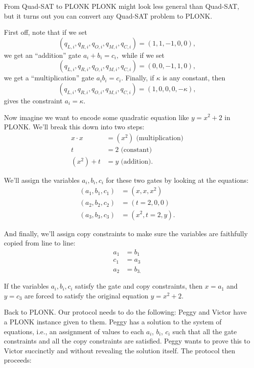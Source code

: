 \begin{remark}{From Quad-SAT to PLONK}{}
PLONK might look less general than Quad-SAT,
but it turns out you can convert any Quad-SAT problem to PLONK.

First off, note that if we set
\[( q_{L,i},q_{R,i},q_{O,i},q_{M,i},q_{C,i} ) = (1,1, - 1,0,0),\]
we get an ``addition'' gate $a_{i} + b_{i} = c_{i},$ while if we set
\[( q_{L,i},q_{R,i},q_{O,i},q_{M,i},q_{C,i} ) = (0,0, - 1,1,0),\]
we get a ``multiplication'' gate $a_{i}b_{i} = c_{i}.$ Finally, if
$\kappa$ is any constant, then
\[( q_{L,i},q_{R,i},q_{O,i},q_{M,i},q_{C,i} ) = (1,0,0,0, - \kappa),\]
gives the constraint $a_{i} = \kappa.$

Now imagine we want to encode some quadratic equation like
$y = x^{2} + 2$ in PLONK. We'll break this down into two steps:
\[\begin{aligned}
x \cdot x & = ( x^{2} )\text{ (multiplication)} \\
t & = 2\text{ (constant)} \\
( x^{2} ) + t & = y\text{ (addition)}.
\end{aligned}\]

We'll assign the variables $a_{i},b_{i},c_{i}$ for these two gates
by looking at the equations: \[\begin{aligned}
( a_{1},b_{1},c_{1} ) & = ( x,x,x^{2} ) \\
( a_{2},b_{2},c_{2} ) & = (t = 2,0,0) \\
( a_{3},b_{3},c_{3} ) & = ( x^{2},t = 2,y ).
\end{aligned}\]

And finally, we'll assign copy constraints to make sure the variables
are faithfully copied from line to line: \[\begin{aligned}
a_{1} & = b_{1} \\
c_{1} & = a_{3} \\
a_{2} & = b_{3.}
\end{aligned}\]

If the variables $a_{i},b_{i},c_{i}$ satisfy the gate and copy
constraints, then $x = a_{1}$ and $y = c_{3}$ are forced to satisfy
the original equation $y = x^{2} + 2$.
\end{remark}

Back to PLONK. Our protocol needs to do the following: Peggy and Victor
have a PLONK instance given to them. Peggy has a solution to the system
of equations, i.e., an assignment of values to each $a_{i}$,
$b_{i}$, $c_{i}$ such that all the gate constraints and all the copy
constraints are satisfied. Peggy wants to prove this to Victor
succinctly and without revealing the solution itself. The protocol then
proceeds:

